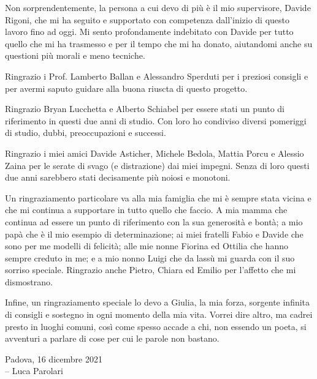 
Non sorprendentemente, la persona a cui devo di più è il mio
supervisore, Davide Rigoni, che mi ha seguito e supportato con
competenza dall'inizio di questo lavoro fino ad oggi. Mi sento
profondamente indebitato con Davide per tutto quello che mi ha
trasmesso e per il tempo che mi ha donato, aiutandomi anche su
questioni più morali e meno tecniche.

\vspace{0.2cm}

Ringrazio i Prof. Lamberto Ballan e Alessandro Sperduti per i preziosi
consigli e per avermi saputo guidare alla buona riuscta di questo
progetto.

\vspace{0.2cm}

Ringrazio Bryan Lucchetta e Alberto Schiabel per essere stati un punto
di riferimento in questi due anni di studio. Con loro ho condiviso
diversi pomeriggi di studio, dubbi, preoccupazioni e successi.

\vspace{0.2cm}

Ringrazio i miei amici Davide Asticher, Michele Bedola, Mattia Porcu e
Alessio Zaina per le serate di svago (e distrazione) dai miei impegni.
Senza di loro questi due anni sarebbero stati decisamente più noiosi e
monotoni.

\vspace{0.2cm}

Un ringraziamento particolare va alla mia famiglia che mi è sempre
stata vicina e che mi continua a supportare in tutto quello che
faccio. A mia mamma che continua ad essere un punto di riferimento con
la sua generosità e bontà; a mio papà che è il mio esempio di
determinazione; ai miei fratelli Fabio e Davide che sono per me
modelli di felicità; alle mie nonne Fiorina ed Ottilia che hanno
sempre creduto in me; e a mio nonno Luigi che da lassù mi guarda con
il suo sorriso speciale. Ringrazio anche Pietro, Chiara ed Emilio per
l'affetto che mi dismostrano.

\vspace{0.2cm}

Infine, un ringraziamento speciale lo devo a Giulia, la mia forza,
sorgente infinita di consigli e sostegno in ogni momento della mia
vita. Vorrei dire altro, ma cadrei presto in luoghi comuni, così come
spesso accade a chi, non essendo un poeta, si avventuri a parlare di
cose per cui le parole non bastano.

\vspace{1cm}

\begin{flushright}
  Padova, 16 dicembre 2021 \\
  -- Luca Parolari
\end{flushright}
